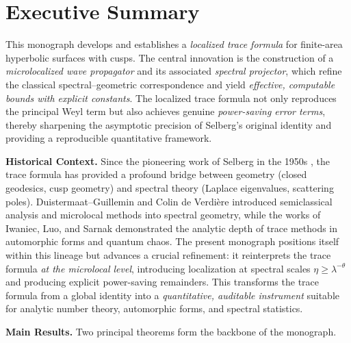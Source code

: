 
\section{Executive Summary}

This monograph develops and establishes a \emph{localized trace formula} for
finite-area hyperbolic surfaces with cusps. The central innovation is the
construction of a \emph{microlocalized wave propagator} and its associated
\emph{spectral projector}, which refine the classical spectral–geometric
correspondence and yield \emph{effective, computable bounds with explicit
constants}. The localized trace formula not only reproduces the principal
Weyl term but also achieves genuine \emph{power-saving error terms}, thereby
sharpening the asymptotic precision of Selberg’s original identity and
providing a reproducible quantitative framework.

\medskip
\noindent\textbf{Historical Context.}
Since the pioneering work of Selberg in the 1950s \cite{Selberg1956}, the trace
formula has provided a profound bridge between geometry (closed geodesics,
cusp geometry) and spectral theory (Laplace eigenvalues, scattering poles).
Duistermaat–Guillemin \cite{DG1975} and Colin de Verdière \cite{CdV1980}
introduced semiclassical analysis and microlocal methods into spectral
geometry, while the works of Iwaniec, Luo, and Sarnak
\cite{IwaniecSarnak1995, LuoSarnak1995} demonstrated the analytic depth of
trace methods in automorphic forms and quantum chaos. The present monograph
positions itself within this lineage but advances a crucial refinement: it
reinterprets the trace formula \emph{at the microlocal level}, introducing
localization at spectral scales $\eta \geq \lambda^{-\theta}$ and producing
explicit power-saving remainders. This transforms the trace formula from a
global identity into a \emph{quantitative, auditable instrument} suitable for
analytic number theory, automorphic forms, and spectral statistics.

\medskip
\noindent\textbf{Main Results.}
Two principal theorems form the backbone of the monograph.

